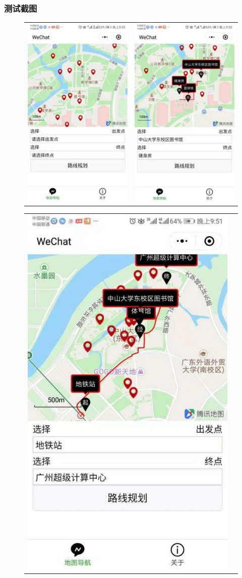 \documentclass[12pt,UTF8]{ctexart}
\begin{document}
\begin{spacing}{1.4}
\subsubsection{测试截图}
\begin{figure}[H]
\centering
\begin{tabular}{cc}
\includegraphics[width=0.3\linewidth]{fig/wechat1.jpg}&
\includegraphics[width=0.3\linewidth]{fig/wechat2.jpg}
\end{tabular}
\end{figure}
\begin{figure}[H]
\centering
\begin{tabular}{cc}
\includegraphics[width=0.3\linewidth]{fig/wechat3.jpg}&

\end{tabular}
\end{figure}
\end{spacing}
\end{document}
